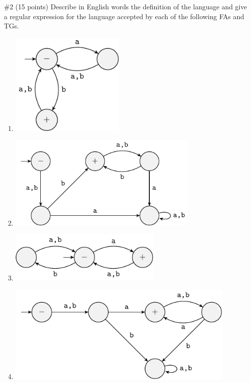 \begin{problem}{\#2 (15 points)}
    Describe in English words the definition of the language and give a regular expression for the language accepted by each of the following FAs and TGs.
    \begin{enumerate}[label=\textbf{\alph*)}]
        \item \includegraphics[width=15em]{figures/question/Question2-A.pdf}
        \item \includegraphics[width=25em]{figures/question/Question2-B.pdf}
        \item \includegraphics[width=20em]{figures/question/Question2-C.pdf}
        \item \includegraphics[width=30em]{figures/question/Question2-D.pdf}

\end{enumerate}
\end{problem}
